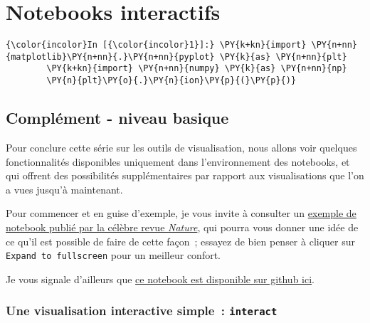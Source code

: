     
    
    
    

    

    \hypertarget{notebooks-interactifs}{%
\section{Notebooks interactifs}\label{notebooks-interactifs}}

    \begin{Verbatim}[commandchars=\\\{\}]
{\color{incolor}In [{\color{incolor}1}]:} \PY{k+kn}{import} \PY{n+nn}{matplotlib}\PY{n+nn}{.}\PY{n+nn}{pyplot} \PY{k}{as} \PY{n+nn}{plt}
        \PY{k+kn}{import} \PY{n+nn}{numpy} \PY{k}{as} \PY{n+nn}{np}
        \PY{n}{plt}\PY{o}{.}\PY{n}{ion}\PY{p}{(}\PY{p}{)}
\end{Verbatim}


    \hypertarget{compluxe9ment---niveau-basique}{%
\subsection{Complément - niveau
basique}\label{compluxe9ment---niveau-basique}}

    Pour conclure cette série sur les outils de visualisation, nous allons
voir quelques fonctionnalités disponibles uniquement dans
l'environnement des notebooks, et qui offrent des possibilités
supplémentaires par rapport aux visualisations que l'on a vues jusqu'à
maintenant.

    Pour commencer et en guise d'exemple, je vous invite à consulter un
\href{http://www.nature.com/news/ipython-interactive-demo-7.21492}{exemple
de notebook publié par la célèbre revue \emph{Nature}}, qui pourra vous
donner une idée de ce qu'il est possible de faire de cette façon~;
essayez de bien penser à cliquer sur \texttt{Expand\ to\ fullscreen}
pour un meilleur confort.

Je vous signale d'ailleurs que
\href{https://github.com/jupyter/nature-demo}{ce notebook est disponible
sur github ici}.

    \hypertarget{une-visualisation-interactive-simple-interact}{%
\subsubsection{\texorpdfstring{Une visualisation interactive simple~:
\texttt{interact}}{Une visualisation interactive simple~: interact}}\label{une-visualisation-interactive-simple-interact}}


